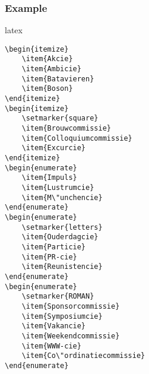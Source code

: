\subsubsection{Example}
\begin{code}{latex} 
\begin{verbatim}
\begin{itemize}
    \item{Akcie}
    \item{Ambicie}
    \item{Batavieren}
    \item{Boson}
\end{itemize}
\begin{itemize}
    \setmarker{square}
    \item{Brouwcommissie}
    \item{Colloquiumcommissie}
    \item{Excurcie}
\end{itemize}
\begin{enumerate}
    \item{Impuls}
    \item{Lustrumcie}
    \item{M\"unchencie}
\end{enumerate}
\begin{enumerate}
    \setmarker{letters}
    \item{Ouderdagcie}
    \item{Particie}
    \item{PR-cie}
    \item{Reunistencie}
\end{enumerate}
\begin{enumerate}
    \setmarker{ROMAN}
    \item{Sponsorcommissie}
    \item{Symposiumcie}
    \item{Vakancie}
    \item{Weekendcommissie}
    \item{WWW-cie}
    \item{Co\"ordinatiecommissie}
\end{enumerate}
\end{verbatim} 
\end{code}

